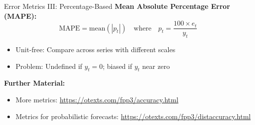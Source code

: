 \documentclass[11pt]{beamer}
\begin{document}
\begin{frame}[fragile]{Error Metrics III: Percentage-Based}
	\textbf{Mean Absolute Percentage Error (MAPE):}
	$$\text{MAPE} = \text{mean}(|p_t|) \quad \text{where} \quad p_t = \frac{100 \times e_t}{y_t}$$
	\begin{itemize}
		\item Unit-free: Compare across series with different scales
		\item Problem: Undefined if $y_t = 0$; biased if $y_t$ near zero
	\end{itemize}

	\vspace{0.5cm}
	\textbf{Further Material:}
	\begin{itemize}
		\item More metrics: \url{https://otexts.com/fpp3/accuracy.html}
		\item Metrics for probabilistic forecasts: \url{https://otexts.com/fpp3/distaccuracy.html}
	\end{itemize}
\end{frame}




\end{document}
